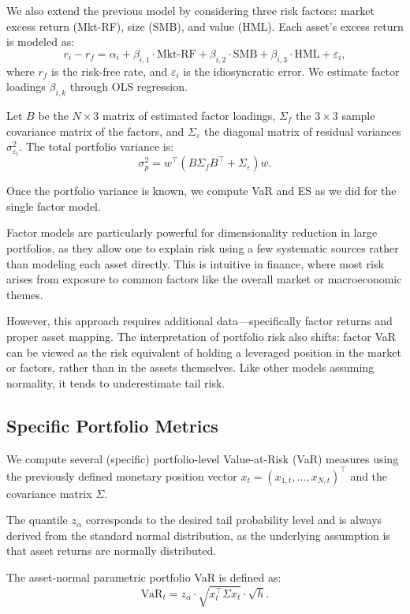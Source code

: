 \documentclass[12pt]{article}
\begin{document}
We also extend the previous model by considering three risk factors: market excess return (Mkt-RF), size (SMB), and value (HML). Each asset’s excess return is modeled as:
\[
r_i - r_f = \alpha_i + \beta_{i,1} \cdot \text{Mkt-RF} + \beta_{i,2} \cdot \text{SMB} + \beta_{i,3} \cdot \text{HML} + \varepsilon_i,
\]
where $r_f$ is the risk-free rate, and $\varepsilon_i$ is the idiosyncratic error. We estimate factor loadings $\beta_{i,k}$ through OLS regression.

Let $B$ be the $N \times 3$ matrix of estimated factor loadings, $\Sigma_f$ the $3 \times 3$ sample covariance matrix of the factors, and $\Sigma_\varepsilon$ the diagonal matrix of residual variances $\sigma_{\varepsilon_i}^2$. The total portfolio variance is:
\[
\sigma_p^2 = w^\top (B \Sigma_f B^\top + \Sigma_\varepsilon) w.
\]

Once the portfolio variance is known, we compute VaR and ES as we did for the single factor model.

Factor models are particularly powerful for dimensionality reduction in large portfolios, as they allow one to explain risk using a few systematic sources rather than modeling each asset directly. This is intuitive in finance, where most risk arises from exposure to common factors like the overall market or macroeconomic themes.

However, this approach requires additional data—specifically factor returns and proper asset mapping. The interpretation of portfolio risk also shifts: factor VaR can be viewed as the risk equivalent of holding a leveraged position in the market or factors, rather than in the assets themselves. Like other models assuming normality, it tends to underestimate tail risk.


\subsection{Specific Portfolio Metrics}

We compute several (specific) portfolio-level Value-at-Risk (VaR) measures using the previously defined monetary position vector \( x_t = (x_{1,t}, \dots, x_{N,t})^\top \) and the covariance matrix \( \Sigma \).

The quantile \( z_\alpha \) corresponds to the desired tail probability level and is always derived from the standard normal distribution, as the underlying assumption is that asset returns are normally distributed.

The asset-normal parametric portfolio VaR is defined as:
\[
  \text{VaR}_t = z_\alpha \cdot \sqrt{x_t^\top \Sigma x_t} \cdot \sqrt{h}.
\]
\end{document}
